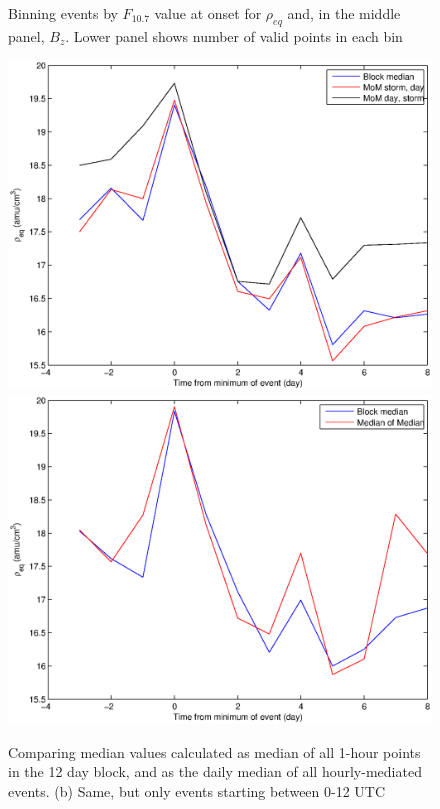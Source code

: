 \documentclass[10pt,twocolumn]{article}
\begin{document}
\begin{figure}[tp!]
\caption{Binning events by $F_{10.7}$ value at onset for $\rho_{eq}$ and, in the middle panel, $B_z$. Lower panel shows number of valid points in each bin}
\label{f107bin}
\end{figure}

\begin{figure}[tp]
\centering
\includegraphics[scale=0.40]{paperfigures/blockmedian.eps}
\includegraphics[scale=0.40]{paperfigures/blockmedian-prenoon.eps}
\caption{Comparing median values calculated as median of all 1-hour points in the 12 day block, and as the daily median of all hourly-mediated events. (b) Same, but only events starting between 0-12 UTC}
\label{blockmedian}
\end{figure}
\clearpage
\end{document}
